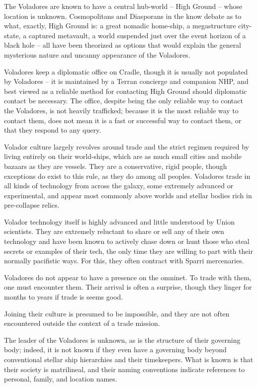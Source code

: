 The Voladores are known to have a central hub-world -- High Ground -- whose location is
unknown. Cosmopolitans and Diasporans in the know debate as to what, exactly, High Ground
is: a great nomadic home-ship, a megastructure city-state, a captured metavault, a world
suspended just over the event horizon of a black hole -- all have been theorized as options that
would explain the general mysterious nature and uncanny appearance of the Voladores.


Voladores keep a diplomatic office on Cradle, though it is usually not populated by Voladores -- it
is maintained by a Terran concierge and companion NHP, and best viewed as a reliable method
for contacting High Ground should diplomatic contact be necessary. The office, despite being
the only reliable way to contact the Voladores, is not heavily trafficked; because it is the most
reliable way to contact them, does not mean it is a fast or successful way to contact them, or
that they respond to any query.





Volador culture largely revolves around trade and the strict regimen required by living entirely on
their world-ships, which are as much small cities and mobile bazaars as they are vessels. They
are a conservative, rigid people, though exceptions do exist to this rule, as they do among all
peoples. Voladores trade in all kinds of technology from across the galaxy, some extremely
advanced or experimental, and appear most commonly above worlds and stellar bodies rich in
pre-collapse relics.


Volador technology itself is highly advanced and little understood by Union scientists. They are
extremely reluctant to share or sell any of their own technology and have been known to actively
chase down or hunt those who steal secrets or examples of their tech, the only time they are
willing to part with their normally pacifistic ways. For this, they often contract with Sparri
mercenaries.


Voladores do not appear to have a presence on the omninet. To trade with them, one must
encounter them. Their arrival is often a surprise, though they linger for months to years if trade is
seems good.


Joining their culture is presumed to be impossible, and they are not often encountered outside
the context of a trade mission.


The leader of the Voladores is unknown, as is the structure of their governing body; indeed, it is
not known if they even have a governing body beyond conventional stellar ship hierarchies and
their timekeepers. What is known is that their society is matrilineal, and their naming conventions
indicate references to personal, family, and location names.

